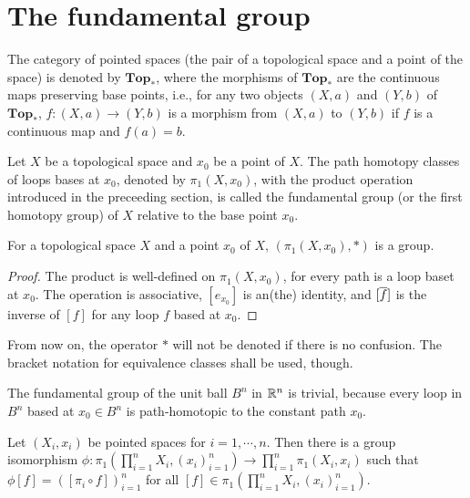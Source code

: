 \section{The fundamental group}

\begin{nota}
    The category of pointed spaces (the pair of a topological space and a point of the space) is denoted by $\textbf{Top}_*$, where the morphisms of $\textbf{Top}_*$ are the continuous maps preserving base points, i.e., for any two objects $(X, a)$ and $(Y, b)$ of $\textbf{Top}_*$, $f: (X, a)\rightarrow (Y, b)$ is a morphism from $(X, a)$ to $(Y, b)$ if $f$ is a continuous map and $f(a)=b$.
\end{nota}

\begin{defi}
    Let $X$ be a topological space and $x_0$ be a point of $X$.
    The path homotopy classes of loops bases at $x_0$, denoted by $\pi_1(X, x_0)$, with the product operation introduced in the preceeding section, is called the fundamental group (or the first homotopy group) of $X$ relative to the base point $x_0$.
\end{defi}
\begin{thm}
    For a topological space $X$ and a point $x_0$ of $X$, $(\pi_1(X, x_0), *)$ is a group.
\end{thm}
\begin{proof}
    The product is well-defined on $\pi_1(X, x_0)$, for every path is a loop baset at $x_0$.
    The operation is associative, $[e_{x_0}]$ is an(the) identity, and $[\overline{f}]$ is the inverse of $[f]$ for any loop $f$ based at $x_0$.
\end{proof}
\begin{rmk}
    From now on, the operator $*$ will not be denoted if there is no confusion.
    The bracket notation for equivalence classes shall be used, though.
\end{rmk}

\begin{exmp}
    The fundamental group of the unit ball $B^n$ in ${\mathbb{R}}^n$ is trivial, because every loop in $B^n$ based at $x_0\in B^n$ is path-homotopic to the constant path $x_0$.
\end{exmp}

\begin{prop}
    Let $(X_i, x_i)$ be pointed spaces for $i=1, \cdots, n$.
    Then there is a group isomorphism $\phi: \pi_1\left(\prod_{i=1}^n X_i, (x_i)_{i=1}^n\right)\rightarrow\prod_{i=1}^n \pi_1(X_i, x_i)$ such that $\phi[f]=([\pi_i\circ f])_{i=1}^n$ for all $[f]\in\pi_1\left(\prod_{i=1}^n X_i, (x_i)_{i=1}^n\right)$.
\end{prop}

